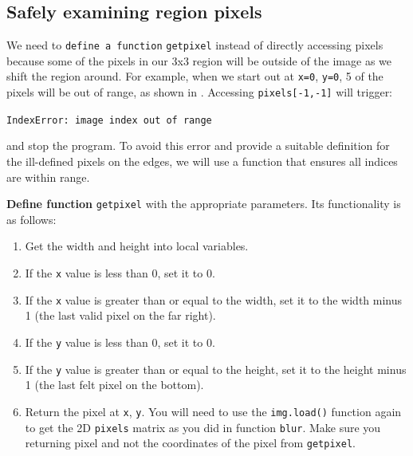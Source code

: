 \subsection{Safely examining region pixels}

We need to {\tt define a function} {\tt getpixel} instead of directly accessing pixels because some of the pixels in our 3x3 region will be outside of the image as we shift the region around. For example, when we start out at {\tt x=0}, {\tt y=0}, 5 of the pixels will be out of range, as shown in .  Accessing {\tt pixels[-1,-1]} will trigger:

\begin{marginfigure}
\begin{center}
\end{center}
\label{outofrange}
\end{marginfigure}

{\tt IndexError: image index out of range}

\noindent and stop the program. To avoid this error and provide a suitable definition for the ill-defined pixels on the edges, we will use a function that ensures all indices are within range.

{\bf Define function} {\tt getpixel} with the appropriate parameters. Its functionality is as follows:
\begin{enumerate}
\item Get the width and height into local variables.
\item If the {\tt x} value is less than 0, set it to 0.
\item If the {\tt x} value is greater than or equal to the width, set it to the width minus 1 (the last  valid pixel on the far right).
\item If the {\tt y} value is less than 0, set it to 0.
\item If the {\tt y} value is greater than or equal to the height, set it to the  height minus 1 (the last felt pixel on the bottom).
\item Return the pixel at {\tt x}, {\tt y}. You will need to use the {\tt img.load()} function again to get the 2D {\tt pixels} matrix as you did in function {\tt blur}. Make sure you returning pixel and not the coordinates of the pixel from {\tt getpixel}.
\end{enumerate}

